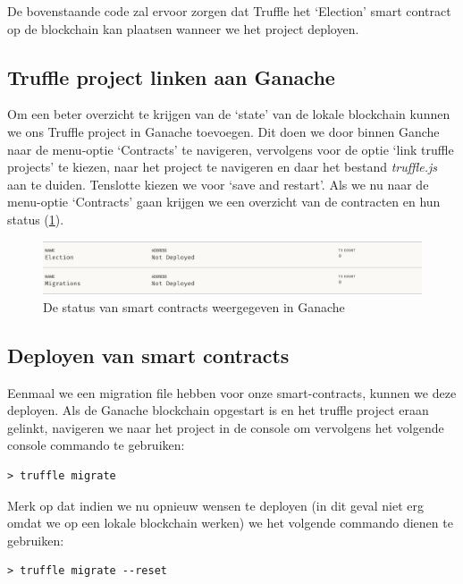 	De bovenstaande code zal ervoor zorgen dat Truffle  het `Election' smart contract op de blockchain kan plaatsen wanneer we het project deployen.
	
	\subsection{Truffle project linken aan Ganache}
	
	Om een beter overzicht te krijgen van de `state' van de lokale blockchain kunnen we ons Truffle project in Ganache toevoegen. Dit doen we door binnen Ganche naar de menu-optie `Contracts' te navigeren, vervolgens voor de optie `link truffle  projects'  te kiezen, naar het project te navigeren en daar het bestand \textit{truffle.js} aan te duiden. Tenslotte  kiezen we voor `save and restart'. Als we nu naar de menu-optie `Contracts' gaan krijgen we een overzicht van de contracten en hun status (\ref{fig:contracts-ganache1}).
	
	\begin{figure}
		\includegraphics[width=\linewidth]{img/contracts-ganache1.png}
		\caption{De status van smart contracts weergegeven in Ganache}
		\label{fig:contracts-ganache1}
	\end{figure}
	
	
	\subsection{Deployen van smart contracts}
	
	Eenmaal we een migration file hebben voor onze smart-contracts, kunnen we deze deployen. Als de Ganache blockchain opgestart is en het truffle project eraan gelinkt, navigeren we naar het project in de console om vervolgens het volgende console commando te gebruiken:
	
	\begin{lstlisting}[numbers=none]
	> truffle migrate
	\end{lstlisting}
	
	Merk op dat indien we nu opnieuw wensen te deployen (in dit geval niet erg omdat we op een lokale blockchain werken) we het volgende commando dienen te gebruiken:
	
	\begin{lstlisting}[numbers=none]
	> truffle migrate --reset
	\end{lstlisting}
	
